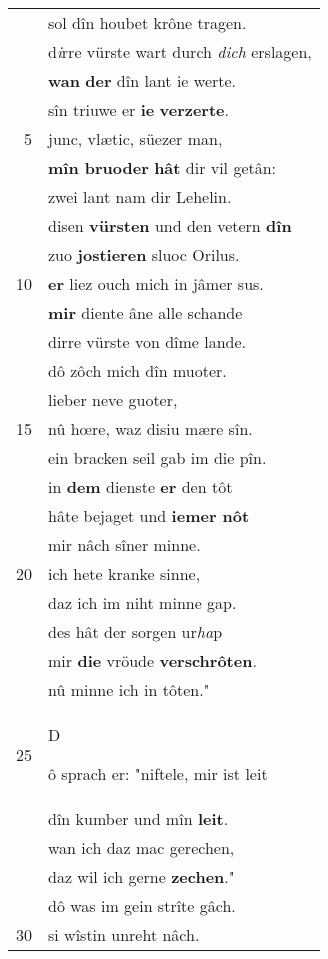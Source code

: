 \documentclass[8pt,a4paper,notitlepage]{article}
\begin{document}
\begin{table}[ht]
\begin{minipage}[t]{0.5\linewidth}
\begin{center}
\end{center}
\begin{tabular}{rl}
 & sol dîn houbet krône tragen.\\ 
 & d\textit{i}rre vürste wart durch \textit{dich} erslagen,\\ 
 & \textbf{wan} \textbf{der} dîn lant ie werte.\\ 
 & sîn triuwe er \textbf{ie} \textbf{verzerte}.\\ 
5 & junc, vlætic, süezer man,\\ 
 & \textbf{mîn bruoder} \textbf{hât} dir vil getân:\\ 
 & zwei lant nam dir Lehelin.\\ 
 & disen \textbf{vürsten} und den vetern \textbf{dîn}\\ 
 & zuo \textbf{jostieren} sluoc Orilus.\\ 
10 & \textbf{er} liez ouch mich in jâmer sus.\\ 
 & \textbf{mir} diente âne alle schande\\ 
 & dirre vürste von dîme lande.\\ 
 & dô zôch mich dîn muoter.\\ 
 & lieber neve guoter,\\ 
15 & nû hœre, waz disiu mære sîn.\\ 
 & ein bracken seil gab im die pîn.\\ 
 & in \textbf{dem} dienste \textbf{er} den tôt\\ 
 & hâte bejaget und \textbf{iemer nôt}\\ 
 & mir nâch sîner minne.\\ 
20 & ich hete kranke sinne,\\ 
 & daz ich im niht minne gap.\\ 
 & des hât der sorgen ur\textit{ha}p\\ 
 & mir \textbf{die} vröude \textbf{verschrôten}.\\ 
 & nû minne ich in tôten."\\ 
25 & \begin{large}D\end{large}ô sprach er: "niftele, mir ist leit\\ 
 & dîn kumber und mîn \textbf{leit}.\\ 
 & wan ich daz mac gerechen,\\ 
 & daz wil ich gerne \textbf{zechen}."\\ 
 & dô was im gein strîte gâch.\\ 
30 & si wîstin unreht nâch.\\ 

\end{tabular}
\end{minipage}
\end{table}
\end{document}

